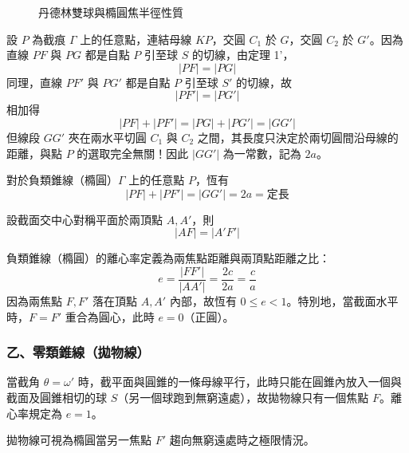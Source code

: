 \begin{figure}[H]
\caption{丹德林雙球與橢圓焦半徑性質}
\label{fig:b4-2-4-1}
\end{figure}

設 $P$ 為截痕 $\Gamma$ 上的任意點，連結母線 $KP$，交圓 $C_1$ 於 $G$，交圓 $C_2$ 於 $G'$。因為直線 $PF$ 與 $PG$ 都是自點 $P$ 引至球 $S$ 的切線，由定理 1'，
\[ |PF| = |PG| \]
同理，直線 $PF'$ 與 $PG'$ 都是自點 $P$ 引至球 $S'$ 的切線，故
\[ |PF'| = |PG'| \]
相加得
\[ |PF| + |PF'| = |PG| + |PG'| = |GG'| \]
但線段 $GG'$ 夾在兩水平切圓 $C_1$ 與 $C_2$ 之間，其長度只決定於兩切圓間沿母線的距離，與點 $P$ 的選取完全無關！因此 $|GG'|$ 為一常數，記為 $2a$。

\begin{proposition}[命題 1（負類錐線焦半徑性質）]
對於負類錐線（橢圓）$\Gamma$ 上的任意點 $P$，恆有
\begin{equation}
|PF| + |PF'| = |GG'| = 2a = \text{定長} \label{eq:b4-2-4-1}
\end{equation}
\end{proposition}

\begin{corollary}[系理 1]
設截面交中心對稱平面於兩頂點 $A, A'$，則
\[ |AF| = |A'F'| \]
\end{corollary}

\begin{definition}[定義]
負類錐線（橢圓）的離心率定義為兩焦點距離與兩頂點距離之比：
\begin{equation}
e = \frac{|FF'|}{|AA'|} = \frac{2c}{2a} = \frac{c}{a} \label{eq:b4-2-4-ecc}
\end{equation}
因為兩焦點 $F, F'$ 落在頂點 $A, A'$ 內部，故恆有 $0 \le e < 1$。特別地，當截面水平時，$F = F'$ 重合為圓心，此時 $e = 0$（正圓）。
\end{definition}

\subsubsection*{乙、零類錐線（拋物線）}

當截角 $\theta = \omega'$ 時，截平面與圓錐的一條母線平行，此時只能在圓錐內放入一個與截面及圓錐相切的球 $S$（另一個球跑到無窮遠處），故拋物線只有一個焦點 $F$。離心率規定為 $e = 1$。

\begin{proposition}[命題 2]
拋物線可視為橢圓當另一焦點 $F'$ 趨向無窮遠處時之極限情況。
\end{proposition}

